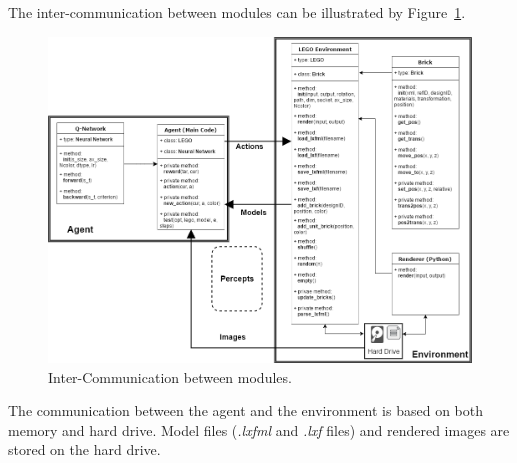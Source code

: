\documentclass[a4paper]{article}
\begin{document}
            The inter-communication between modules can be illustrated by Figure~\ref{fig:inter-communication}. 
            
            \begin{figure}[h]
                \centering
                \includegraphics[height=0.99\textwidth, angle=-90]{inter-communication.png}
                \caption{Inter-Communication between modules.} 
                \label{fig:inter-communication}
                
            \end{figure}
        
	        The communication between the agent and the environment is based on both memory and hard drive. Model files (\textit{.lxfml} and \textit{.lxf} files) and rendered images are stored on the hard drive.
	        
	        
            
            
            
            
            

            

            
            
            
            
            
\end{document}
